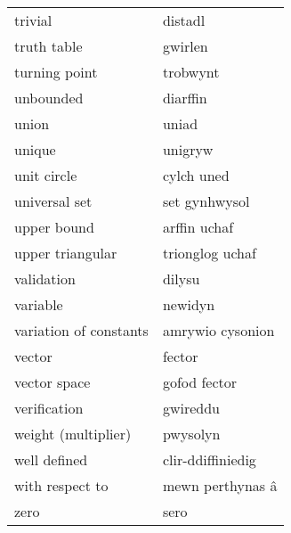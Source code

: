 \begin{supertabular}{p{0.22\textwidth}p{0.22\textwidth}}
                         trivial &                         distadl \\
                     truth table &                         gwirlen \\
                   turning point &                        trobwynt \\
                       unbounded &                        diarffin \\
                           union &                           uniad \\
                          unique &                         unigryw \\
                     unit circle &                      cylch uned \\
                   universal set &                   set gynhwysol \\
                     upper bound &                    arffin uchaf \\
                upper triangular &                 trionglog uchaf \\
                      validation &                          dilysu \\
                        variable &                         newidyn \\
          variation of constants &                amrywio cysonion \\
                          vector &                          fector \\
                    vector space &                    gofod fector \\
                    verification &                        gwireddu \\
             weight (multiplier) &                        pwysolyn \\
                    well defined &               clir-ddiffiniedig \\
                 with respect to &                mewn perthynas â \\
                            zero &                            sero \\
\end{supertabular}
